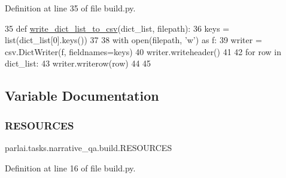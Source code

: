 Definition at line 35 of file build.\+py.


\begin{DoxyCode}
35 \textcolor{keyword}{def }\hyperlink{namespaceparlai_1_1tasks_1_1narrative__qa_1_1build_ab49502ac724edd933f89bec8f414b452}{write\_dict\_list\_to\_csv}(dict\_list, filepath):
36     keys = list(dict\_list[0].keys())
37 
38     with open(filepath, \textcolor{stringliteral}{'w'}) \textcolor{keyword}{as} f:
39         writer = csv.DictWriter(f, fieldnames=keys)
40         writer.writeheader()
41 
42         \textcolor{keywordflow}{for} row \textcolor{keywordflow}{in} dict\_list:
43             writer.writerow(row)
44 
45 
\end{DoxyCode}


\subsection{Variable Documentation}
\mbox{\label{namespaceparlai_1_1tasks_1_1narrative__qa_1_1build_aa2ea03188267ab219abf13b1203daacd}} 
\subsubsection{\texorpdfstring{R\+E\+S\+O\+U\+R\+C\+ES}{RESOURCES}}
{\footnotesize\ttfamily parlai.\+tasks.\+narrative\+\_\+qa.\+build.\+R\+E\+S\+O\+U\+R\+C\+ES}



Definition at line 16 of file build.\+py.

